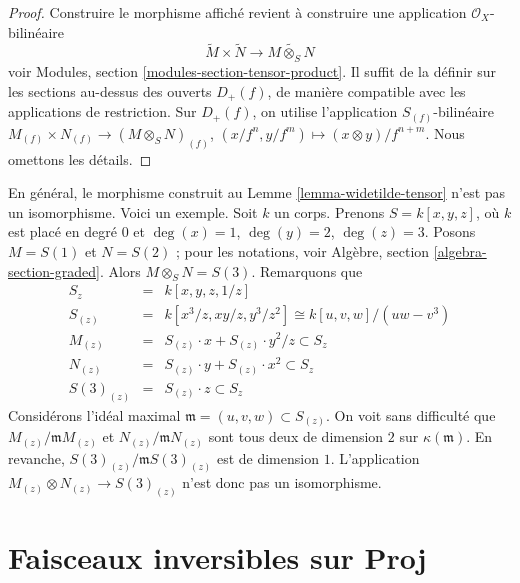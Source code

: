 \begin{proof}
Construire le morphisme affiché revient à construire une application
$\mathcal{O}_X$-bilinéaire
$$
\widetilde M \times \widetilde N
\longrightarrow
\widetilde{M \otimes_S N}
$$
voir Modules, section \ref{modules-section-tensor-product}. Il suffit de la
définir sur les sections au-dessus des ouverts $D_{+}(f)$, de manière
compatible avec les applications de restriction. Sur $D_{+}(f)$, on utilise
l'application $S_{(f)}$-bilinéaire
$M_{(f)} \times N_{(f)} \to (M \otimes_S N)_{(f)}$,
$(x/f^n, y/f^m) \mapsto (x \otimes y)/f^{n + m}$. Nous omettons les détails.
\end{proof}

\begin{remark}
\label{remark-not-isomorphism}
En général, le morphisme construit au Lemme \ref{lemma-widetilde-tensor}
n'est pas un isomorphisme. Voici un exemple. Soit $k$ un corps. Prenons
$S = k[x, y, z]$, où $k$ est placé en degré $0$ et
$\deg(x) = 1$, $\deg(y) = 2$, $\deg(z) = 3$.
Posons $M = S(1)$ et $N = S(2)$ ; pour les notations, voir Algèbre,
section \ref{algebra-section-graded}. Alors $M \otimes_S N = S(3)$.
Remarquons que
\begin{eqnarray*}
S_z
& = &
k[x, y, z, 1/z] \\
S_{(z)}
& = &
k[x^3/z, xy/z, y^3/z^2]
\cong
k[u, v, w]/(uw - v^3) \\
M_{(z)} & = & S_{(z)} \cdot x + S_{(z)} \cdot y^2/z \subset S_z \\
N_{(z)} & = & S_{(z)} \cdot y + S_{(z)} \cdot x^2 \subset S_z \\
S(3)_{(z)} & = & S_{(z)} \cdot z \subset S_z
\end{eqnarray*}
Considérons l'idéal maximal $\mathfrak m = (u, v, w) \subset S_{(z)}$.
On voit sans difficulté que $M_{(z)}/\mathfrak mM_{(z)}$ et
$N_{(z)}/\mathfrak mN_{(z)}$ sont tous deux de dimension $2$ sur
$\kappa(\mathfrak m)$. En revanche,
$S(3)_{(z)}/\mathfrak mS(3)_{(z)}$ est de dimension $1$.
L'application $M_{(z)} \otimes N_{(z)} \to S(3)_{(z)}$
n'est donc pas un
isomorphisme.
\end{remark}









\section{Faisceaux inversibles sur Proj}
\label{section-invertible-on-proj}

